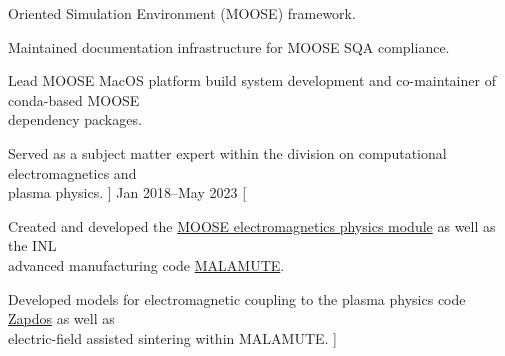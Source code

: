 {					Oriented Simulation Environment (MOOSE) framework.
		\item Maintained documentation infrastructure for MOOSE SQA compliance.
		\item Lead MOOSE MacOS platform build system development and co-maintainer of conda-based MOOSE \\
					dependency packages.
		\item Served as a subject matter expert within the division on computational electromagnetics and \\
					plasma physics.
	]
				{Jan 2018--May 2023}
		[
		\item Created and developed the \href{https://mooseframework.inl.gov/modules/electromagnetics}{MOOSE electromagnetics physics module} as well as the INL \\
					advanced manufacturing code \href{https://malamute.inl.gov}{MALAMUTE}.
		\item Developed models for electromagnetic coupling to the plasma physics code \href{https://shannon-lab.github.io/zapdos}{Zapdos} as well as \\
					electric-field assisted sintering within MALAMUTE.
		]
}

\newcommand{\ornlcontent}{
	\cvitem{Oak Ridge National Laboratory (ORNL), Oak Ridge, TN}
					{Graduate Student Intern, Fusion and Materials for Nuclear Systems Division}
					{Jul 2016--Dec 2017}
	[
		\item Developed code for simple radio-frequency (RF) electromagnetic simulation in support \\
					of ion cyclotron resonance heating (ICRH) studies for fusion energy systems
	]
}

\newcommand{\ncsucontent}{
	\cvitem{North Carolina State University (NCSU), Nuclear Engr. Dept., Raleigh, NC}
			{Graduate Research Assistant, 4th State Applications Research Group}{Jul 2013--Jun 2016}
		[
		\item Utilized particle-in-cell codes (VSim, XPDP1) to study capacitively-coupled RF \\
					plasma discharges
		]
		\cvitemsub{Dean's Doctoral Fellow, NCSU College of Engineering}{Aug 2012--Jun 2013}
		[
			\item Modeled proof-of-concept Z-pinch plasma neutron source for reinforced concrete \\
						structural interrogation using MATLAB
		]
}
